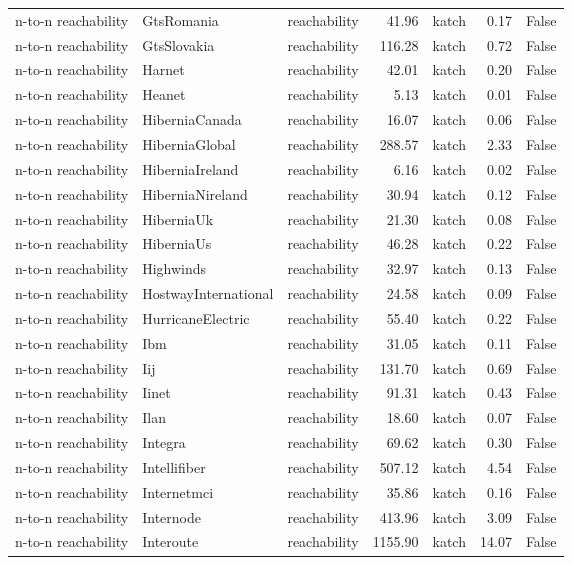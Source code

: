 \begin{tabular}{lllrlrr}
n-to-n reachability & GtsRomania & reachability & 41.96 & katch & 0.17 & False \\
n-to-n reachability & GtsSlovakia & reachability & 116.28 & katch & 0.72 & False \\
n-to-n reachability & Harnet & reachability & 42.01 & katch & 0.20 & False \\
n-to-n reachability & Heanet & reachability & 5.13 & katch & 0.01 & False \\
n-to-n reachability & HiberniaCanada & reachability & 16.07 & katch & 0.06 & False \\
n-to-n reachability & HiberniaGlobal & reachability & 288.57 & katch & 2.33 & False \\
n-to-n reachability & HiberniaIreland & reachability & 6.16 & katch & 0.02 & False \\
n-to-n reachability & HiberniaNireland & reachability & 30.94 & katch & 0.12 & False \\
n-to-n reachability & HiberniaUk & reachability & 21.30 & katch & 0.08 & False \\
n-to-n reachability & HiberniaUs & reachability & 46.28 & katch & 0.22 & False \\
n-to-n reachability & Highwinds & reachability & 32.97 & katch & 0.13 & False \\
n-to-n reachability & HostwayInternational & reachability & 24.58 & katch & 0.09 & False \\
n-to-n reachability & HurricaneElectric & reachability & 55.40 & katch & 0.22 & False \\
n-to-n reachability & Ibm & reachability & 31.05 & katch & 0.11 & False \\
n-to-n reachability & Iij & reachability & 131.70 & katch & 0.69 & False \\
n-to-n reachability & Iinet & reachability & 91.31 & katch & 0.43 & False \\
n-to-n reachability & Ilan & reachability & 18.60 & katch & 0.07 & False \\
n-to-n reachability & Integra & reachability & 69.62 & katch & 0.30 & False \\
n-to-n reachability & Intellifiber & reachability & 507.12 & katch & 4.54 & False \\
n-to-n reachability & Internetmci & reachability & 35.86 & katch & 0.16 & False \\
n-to-n reachability & Internode & reachability & 413.96 & katch & 3.09 & False \\
n-to-n reachability & Interoute & reachability & 1155.90 & katch & 14.07 & False \\

\end{tabular}
